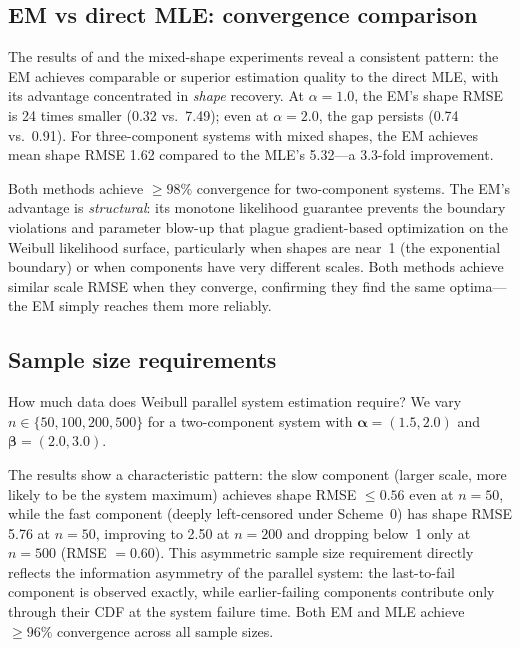 \documentclass[12pt]{article}
\theoremstyle{definition}
\theoremstyle{remark}
\newcommand{\balpha}{\boldsymbol{\alpha}}
\newcommand{\bbeta}{\boldsymbol{\beta}}
\begin{document}
\subsection{EM vs direct MLE: convergence comparison}
\label{sec:em-convergence}

The results of  and the mixed-shape
experiments reveal a consistent pattern: the EM achieves
comparable or superior estimation quality to the direct MLE,
with its advantage concentrated in \emph{shape} recovery.
At $\alpha = 1.0$, the EM's shape RMSE is 24 times smaller
(0.32 vs.\ 7.49); even at $\alpha = 2.0$, the gap persists
(0.74 vs.\ 0.91).  For three-component systems with mixed
shapes, the EM achieves mean shape RMSE 1.62 compared to
the MLE's 5.32---a 3.3-fold improvement.

Both methods achieve $\geq 98\%$ convergence for
two-component systems.  The EM's advantage is
\emph{structural}: its monotone likelihood guarantee prevents
the boundary violations and parameter blow-up that plague
gradient-based optimization on the Weibull likelihood surface,
particularly when shapes are near~1 (the exponential boundary)
or when components have very different scales.
Both methods achieve similar scale RMSE when they converge,
confirming they find the same optima---the EM simply reaches
them more reliably.

\subsection{Sample size requirements}
\label{sec:em-sample-size}

How much data does Weibull parallel system estimation require?
We vary $n \in \{50, 100, 200, 500\}$ for a two-component system
with $\balpha = (1.5, 2.0)$ and $\bbeta = (2.0, 3.0)$.

The results show a characteristic pattern: the slow component
(larger scale, more likely to be the system maximum) achieves
shape RMSE $\leq 0.56$ even at $n = 50$, while the fast component
(deeply left-censored under Scheme~0) has shape RMSE 5.76 at
$n = 50$, improving to 2.50 at $n = 200$ and dropping below~1
only at $n = 500$ (RMSE $= 0.60$).  This asymmetric sample
size requirement directly reflects the information asymmetry
of the parallel system: the last-to-fail component is observed
exactly, while earlier-failing components contribute only through
their CDF at the system failure time.  Both EM and MLE achieve
$\geq 96\%$ convergence across all sample sizes.
\end{document}
